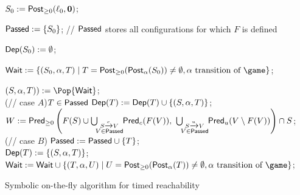 \begin{algorithm}
  \SetAlgoNoEnd

  $S_0:=\textrm{\sf Post}_{\geq 0}(\ell_0,\mathbf 0)$;
  
  


  $\textsf{Passed}:=\{S_0\}$;  \hfill
  // $\textsf{Passed}$ stores all configurations for which $F$ is defined

  
  $\textsf{Dep}(S_0):=\emptyset$;

  $\Wait:=\{(S_0,\alpha,T) \mid 
    T=\posttime(\postta_{\alpha}(S_0))\not=\emptyset, \alpha\text{ transition of }\game\}$;

        {$(S,\alpha,T)):=\Pop{\Wait}$;\\
          \If(\hfill{// case $A$}){$T\in\textsf{Passed}$}
          {$\textsf{Dep}(T):=\textsf{Dep}(T) \cup \{(S,\alpha,T)\}$;\\
          $W:=\predt\left(F(S)\cup \bigcup_{\substack{S\xrightarrow{c} V\\ \!\!V\in\Passed\!\!}} \predc(F(V)),\ \bigcup_{\substack{S\xrightarrow{u} V\\ \!\!V\in\Passed\!\!}}\predu(V\setminus F(V))\right) \cap S$;\\
          }
          \Else(\hfill{// case $B$})
                  {$\textsf{Passed}:=\textsf{Passed} \cup\{T\}$; \\
                  $\textsf{Dep}(T):=\{(S,\alpha,T)\}$;\\
                  $\Wait:=\Wait\cup\{(T,\alpha,U) \mid U=\posttime(\postta_{\alpha}(T))\not=\emptyset, \alpha\text{ transition of }\game\}$;
        }
        }

        \caption{Symbolic on-the-fly algorithm for timed reachability}
  \label{10-algo:sotftr}
\end{algorithm}




